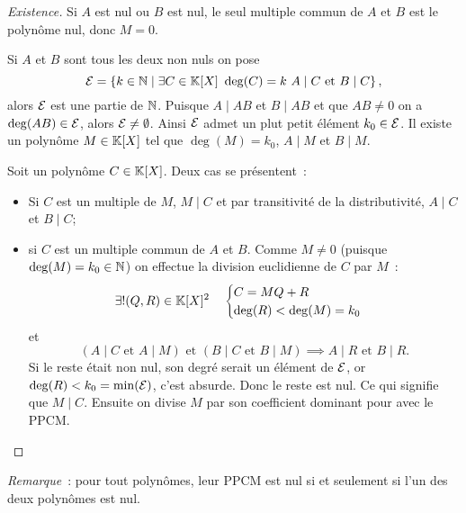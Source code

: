 \begin{proof}[Existence]
  Si \(A\) est nul ou \(B\) est nul, le seul multiple commun de \(A\) et \(B\) 
  est le polynôme nul, donc \(M = 0\).

  Si \(A\) et \(B\) sont tous les deux non nuls on pose
  \begin{equation}
    \mathcal{E} = \left\{k \in \mathbb{N}\mathrel{}\middle|\mathrel{}\exists C \in \mathbb{K}[X] \ \deg(C) = k \ A\mid{}C \text{~et~} 
    B\mid{}C\right\},
  \end{equation}
  alors \(\mathcal{E}\) est une partie de \(\mathbb{N}\). Puisque \(A\mid{}AB\) et \(B\mid{}AB\) 
  et que \(AB \neq 0\) on a \(\deg(AB) \in \mathcal{E}\), alors \(\mathcal{E}\neq \emptyset\). 
  Ainsi \(\mathcal{E}\) admet un plut petit élément \(k_0 \in \mathcal{E}\). Il existe un polynôme 
  \(M \in \mathbb{K}[X]\) tel que \(\deg(M) = k_0\), \(A\mid{}M\) et \(B\mid{}M\).

  Soit un polynôme \(C \in \mathbb{K}[X]\). Deux cas se présentent~:
  \begin{itemize}
    \item Si \(C\) est un multiple de \(M\), \(M\mid{}C\) et par transitivité de 
      la distributivité, \(A\mid{}C\) et \(B\mid{}C\);
    \item si \(C\) est un multiple commun de \(A\) et \(B\). Comme \(M \neq 0\) 
      (puisque \(\deg(M) = k_0 \in \mathbb{N}\)) on effectue la division euclidienne de 
      \(C\) par \(M\)~:
      \begin{equation}
        \exists! (Q,R) \in \mathbb{K}[X]^2 \quad \begin{cases} C = MQ+R \\ \deg(R) < 
        \deg(M) = k_0 \end{cases}
      \end{equation}
      et
      \begin{equation}
        (A\mid{}C \text{~et~} A\mid{}M) \text{~et~} (B\mid{}C \text{~et~} 
        B\mid{}M) \implies A\mid{}R \text{~et~} B\mid{}R.
      \end{equation}
      Si le reste était non nul, son degré serait un élément de \(\mathcal{E}\), or 
      \(\deg(R) < k_0 = \min(\mathcal{E})\), c'est absurde. Donc le reste est nul. Ce qui 
      signifie que \(M\mid{}C\). Ensuite on divise \(M\) par son coefficient 
      dominant pour avec le PPCM.\@
  \end{itemize}
\end{proof}

\emph{Remarque}~: pour tout polynômes, leur PPCM est nul si et seulement si l'un 
des deux polynômes est nul.

